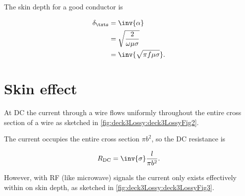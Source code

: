 The skin depth for a good conductor is

\begin{equation}\label{eqn:uwavesLecture3:500}
\begin{aligned}
\delta_\txts &= \inv{\alpha} \\ &= \sqrt{\frac{2}{ \omega \mu \sigma } } \\ &= \inv{\sqrt{\pi f \mu \sigma}}.
\end{aligned}
\end{equation}


\section{Skin effect}

At DC the current through a wire flows uniformly throughout the entire cross section of a wire as sketched in \cref{fig:deck3Lossy:deck3LossyFig2}.


The current occupies the entire cross section \( \pi b^2 \), so the DC resistance is

\begin{equation}\label{eqn:uwavesLecture3:540}
R_{\textrm{DC}} = \inv{\sigma} \frac{l}{\pi b^2}.
\end{equation}

However, with RF (like microwave) signals the current only exists effectively within on skin depth, as sketched in \cref{fig:deck3Lossy:deck3LossyFig3}.

